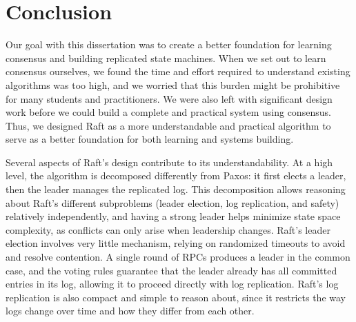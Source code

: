 \chapter{Conclusion}
\label{conclusion}

Our goal with this dissertation was to create a better foundation for
learning consensus and building replicated state machines. When we set
out to learn consensus ourselves, we found the time and effort required
to understand existing algorithms was too high, and we worried that this
burden might be prohibitive for many students and practitioners. We were
also left with significant design work before we could build a complete
and practical system using consensus. Thus, we designed Raft as a more
understandable and practical algorithm to serve as a better foundation for
both learning and systems building.


Several aspects of Raft's design contribute to its understandability. At
a high level, the algorithm is decomposed differently from Paxos: it
first elects a leader, then the leader manages the replicated log. This
decomposition allows reasoning about Raft's different subproblems (leader
election, log replication, and safety) relatively independently, and
having a strong leader helps minimize state space complexity, as
conflicts can only arise when leadership changes. Raft's leader election
involves very little mechanism, relying on randomized timeouts to avoid
and resolve contention. A single round of RPCs produces a leader in the
common case, and the voting rules guarantee that the leader already has all
committed entries in its log, allowing
it to proceed directly with log replication. Raft's log replication is
also compact and simple to reason about, since it restricts the way
logs change over time and how they differ from each other.
%

